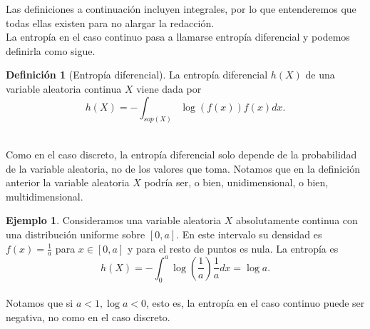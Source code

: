 \documentclass[12pt,a4paper]{report} %
\theoremstyle{definition}
\newtheorem{definition}{Definición}[section]
\newtheorem{example}[theorem]{Ejemplo}
\begin{document}
Las definiciones a continuación incluyen integrales, por lo que entenderemos que todas ellas existen para no alargar la redacción.\\

La entropía en el caso continuo pasa a llamarse entropía diferencial y podemos definirla como sigue.\\

\begin{definition}[Entropía diferencial]
  La entropía diferencial $h(X)$ de una variable aleatoria continua $X$ viene dada por \[
h(X) = - \int_{sop(X)}\log \left(f(x)\right) f(x) dx.
\]\\[-10pt]
\end{definition}

Como en el caso discreto, la entropía diferencial solo depende de la probabilidad de la variable aleatoria, no de los valores que toma. Notamos que en la definición anterior la variable aleatoria $X$ podría ser, o bien, unidimensional, o bien, multidimensional.\\

\begin{example}\label{ej:uni} Consideramos una variable aleatoria $X$ absolutamente continua con una distribución uniforme sobre $[0,a]$. En este intervalo su densidad es $f(x) = \frac{1}{a}$ para $x\in[0,a]$ y para el resto de puntos es nula. La entropía es \[
h(X) = - \int_0^a\log\left(\frac{1}{a}\right)\frac{1}{a}dx = \log a.
  \]\\[-5pt]
Notamos que si $a<1, \log a < 0$, esto es, la entropía en el caso continuo puede ser negativa, no como en el caso discreto.\\
\end{example}
\end{document}
